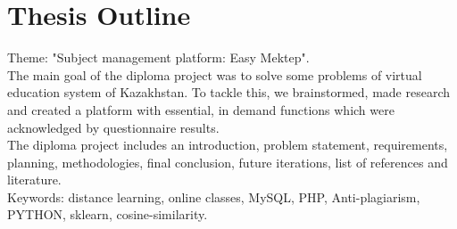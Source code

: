 \section{Thesis Outline}
Theme: "Subject management platform: Easy Mektep". \\
The main goal of the diploma project was to solve some problems of virtual education system of Kazakhstan. To tackle this, we brainstormed, made research and created a platform with essential, in demand functions which were acknowledged by questionnaire results.\\
The diploma project includes an introduction, problem statement, requirements, planning, methodologies, final conclusion, future iterations, list of references and literature.\\
Keywords: distance learning, online classes, MySQL, PHP, Anti-plagiarism, PYTHON, sklearn, cosine-similarity.
